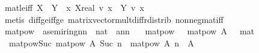 \begin{isabellebody}
{\isafoldproof}%
%
\isadelimproof
\isanewline
%
\endisadelimproof
\isanewline
{}\isamarkupfalse%
\ mat{\isacharunderscore}{\kern0pt}le{\isacharunderscore}{\kern0pt}iff{\isacharcolon}{\kern0pt}\ {\isachardoublequoteopen}{\isacharparenleft}{\kern0pt}X\ {\isasymle}\ Y{\isacharparenright}{\kern0pt}\ {\isasymlongleftrightarrow}\ {\isacharparenleft}{\kern0pt}{\isasymforall}x{\isasymge}{}{\isachardot}{\kern0pt}\ {\isacharparenleft}{\kern0pt}X{\isacharcolon}{\kern0pt}{\isacharcolon}{\kern0pt}real{\isacharcircum}{\kern0pt}{\isacharunderscore}{\kern0pt}{\isacharcircum}{\kern0pt}{\isacharunderscore}{\kern0pt}{\isacharparenright}{\kern0pt}\ {\isacharasterisk}{\kern0pt}v\ x\ {\isasymle}\ Y\ {\isacharasterisk}{\kern0pt}v\ x{\isacharparenright}{\kern0pt}{\isachardoublequoteclose}\isanewline
%
\isadelimproof
\ \ %
\endisadelimproof
%
\isatagproof
{}\isamarkupfalse%
\ {\isacharparenleft}{\kern0pt}metis\ diff{\isacharunderscore}{\kern0pt}ge{\isacharunderscore}{\kern0pt}{}{\isacharunderscore}{\kern0pt}iff{\isacharunderscore}{\kern0pt}ge\ matrix{\isacharunderscore}{\kern0pt}vector{\isacharunderscore}{\kern0pt}mult{\isacharunderscore}{\kern0pt}diff{\isacharunderscore}{\kern0pt}rdistrib\ nonneg{\isacharunderscore}{\kern0pt}mat{\isacharunderscore}{\kern0pt}iff{\isacharparenright}{\kern0pt}%
\endisatagproof
{\isafoldproof}%
%
\isadelimproof
%
\endisadelimproof
%
\isadelimdocument
%
\endisadelimdocument
%
\isatagdocument
%
\isamarkuptrue%
%
\endisatagdocument
{\isafolddocument}%
%
\isadelimdocument
%
\endisadelimdocument
{}\isamarkupfalse%
\ matpow\ {\isacharcolon}{\kern0pt}{\isacharcolon}{\kern0pt}\ {\isachardoublequoteopen}{\isacharprime}{\kern0pt}a{\isacharcolon}{\kern0pt}{\isacharcolon}{\kern0pt}semiring{\isacharunderscore}{\kern0pt}{}{\isacharcircum}{\kern0pt}{\isacharprime}{\kern0pt}n{\isacharcircum}{\kern0pt}{\isacharprime}{\kern0pt}n\ {\isasymRightarrow}\ nat\ {\isasymRightarrow}\ {\isacharprime}{\kern0pt}a{\isacharcircum}{\kern0pt}{\isacharprime}{\kern0pt}n{\isacharcircum}{\kern0pt}{\isacharprime}{\kern0pt}n{\isachardoublequoteclose}\ \isanewline
\ \ matpow{\isacharunderscore}{\kern0pt}{}{\isacharcolon}{\kern0pt}\ \ \ {\isachardoublequoteopen}matpow\ A\ {}\ {\isacharequal}{\kern0pt}\ mat\ {}{\isachardoublequoteclose}\ {\isacharbar}{\kern0pt}\isanewline
\ \ matpow{\isacharunderscore}{\kern0pt}Suc{\isacharcolon}{\kern0pt}\ {\isachardoublequoteopen}matpow\ A\ {\isacharparenleft}{\kern0pt}Suc\ n{\isacharparenright}{\kern0pt}\ {\isacharequal}{\kern0pt}\ {\isacharparenleft}{\kern0pt}matpow\ A\ n{\isacharparenright}{\kern0pt}\ {\isacharasterisk}{\kern0pt}{\isacharasterisk}{\kern0pt}\ A{\isachardoublequoteclose}\isanewline

\end{isabellebody}
